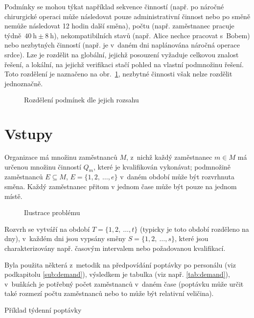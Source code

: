 \documentclass[twoside]{ctuthesis}
\begin{document}
Podmínky se mohou týkat například sekvence činností (např. po náročné chirurgické operaci může následovat pouze administrativní činnost nebo po směně nemůže následovat 12 hodin další směna), počtu (např. zaměstnanec pracuje týdně~$ 40~\mbox{h} \pm 8~\mbox{h}$), nekompatibilních stavů (např. Alice nechce pracovat s~Bobem) nebo nezbytných činností (např. je v~daném dni naplánována náročná operace srdce). Lze je rozdělit na globální, jejichž posouzení vyžaduje celkovou znalost řešení, a lokální, na jejichž verifikaci stačí pohled na vlastní podmnožinu řešení. Toto rozdělení je naznačeno na obr.~\ref{fig:constraints}, nezbytné činnosti však nelze rozdělit jednoznačně. \cite{blochliger2004modeling}

\begin{figure}
	
	\caption{Rozdělení podmínek dle jejich rozsahu}
	\label{fig:constraints}
\end{figure}



\section{Vstupy}
Organizace má množinu zaměstnanců $M$, z~nichž každý zaměstnanec $m \in M$ má určenou množinu činností $Q_m$, které je kvalifikován vykonávat; podmnožině zaměstnanců $E \subseteq M$, $E = \{ 1, 2,~\ldots, e \}$ v~daném období může být rozvrhnuta směna. Každý zaměstnanec přitom v jednom čase může být pouze na jednom místě.

\begin{figure}[h]
	
	\caption{Ilustrace problému}
	\label{fig:definition}
\end{figure}

Rozvrh se vytváří na období $T = \{1, 2,~\ldots, t \}$ (typicky je toto období rozděleno na dny), v~každém dni jsou vypsány směny $S = \{ 1, 2,~\ldots, s\}$, které jsou charakterizovány např. časovým intervalem nebo požadovanou kvalifikací.

Byla použita některá z~metodik na předpovídání poptávky po personálu (viz podkapitolu \ref{sub:demand}), výsledkem je tabulka (viz např. \ref{tab:demand}), v~buňkách je potřebný počet zaměstnanců v~daném čase (poptávku může určit také rozmezí počtu zaměstnanců  nebo to může být relativní veličina).

\begin{table}[h]
	
	\caption{Příklad týdenní poptávky}
	\label{tab:demand}
\end{table}
\end{document}
